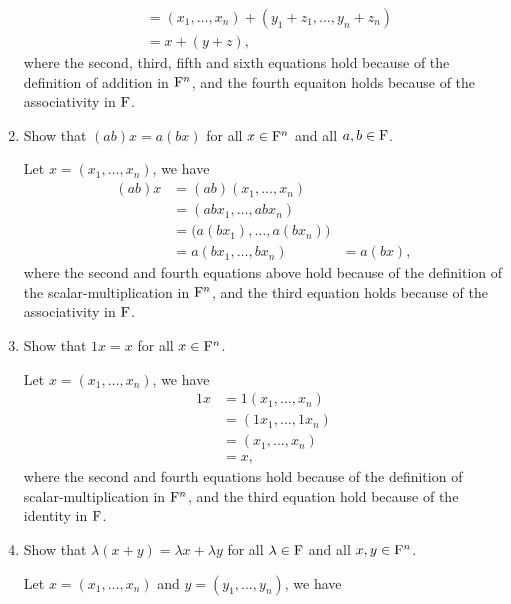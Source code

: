 \begin{enumerate}
\begin{solution}
\begin{align*}
                          &= (x_1,\ldots,x_n) + (y_1+z_1, \ldots, y_n+z_n) \\
                          &= x + (y+z),
            \end{align*}
            where the second, third, fifth and sixth equations hold because of the definition of addition in $\mathrm{F}^n$, and the fourth equaiton holds because 
            of the associativity in $\mathrm{F}$.
        \end{solution}
    \item Show that $(ab)x = a(bx)$ for all $x\in \mathrm{F}^n$ and all $a, b \in \mathrm{F}$.
        \begin{solution}
            Let $x = (x_1, \ldots, x_n)$, we have 
            \begin{align*}
                (ab)x &= (ab)(x_1, \ldots, x_n) \\
                      &= (abx_1, \ldots, abx_n) \\
                      &= \big(a(bx_1), \ldots, a(bx_n)\big)\\
                      &= a(bx_1, \ldots, bx_n)
                      &= a(bx),
            \end{align*}
            where the second and fourth equations above hold because of the definition of the scalar-multiplication in $\mathrm{F}^n$,
            and the third equation holds because of the associativity in $\mathrm{F}$.
        \end{solution}
    \item Show that $1x = x$ for all $x \in \mathrm{F}^n$.
        \begin{solution}
            Let $x = (x_1, \ldots, x_n)$, we have 
            \begin{align*}
                1 x &= 1 (x_1, \ldots, x_n) \\
                    &= (1x_1, \ldots, 1x_n) \\
                    &= (x_1, \ldots, x_n) \\
                    &= x,
            \end{align*}
            where the second and fourth equations hold because of the definition of scalar-multiplication in $\mathrm{F}^n$, and 
            the third equation hold because of the identity in $\mathrm{F}$.
        \end{solution}
    \item Show that $\lambda(x+y) = \lambda x + \lambda y$ for all $\lambda \in \mathrm{F}$ and all $x,y \in \mathrm{F}^n$.
        \begin{solution}
            Let $x = (x_1, \ldots, x_n)$ and $y = (y_1, \ldots, y_n)$, we have 

\end{solution}
\end{enumerate}
